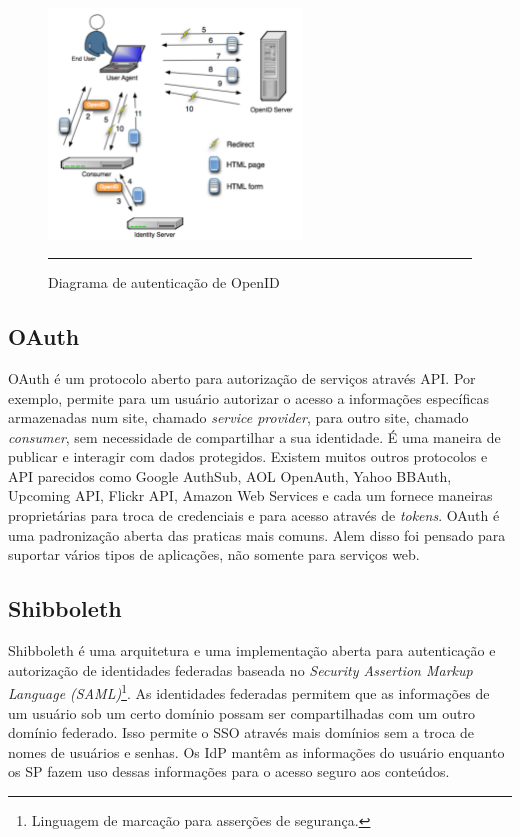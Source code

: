 \begin{figure}[htbp]
  \centering
  \includegraphics[width=0.6\textwidth]{./Figure/OpenID_Scenario.pdf}
  \rule{35em}{0.5pt}
  \caption[Diagrama de autenticação de OpenID]{Diagrama de autenticação de OpenID}
  \label{fig:OpenID}
\end{figure}

\subsection{OAuth}
OAuth é um protocolo aberto para autorização de serviços através
API. Por exemplo, permite para um usuário autorizar o acesso a
informações específicas armazenadas num site, chamado \emph{service
  provider}, para outro site, chamado \emph{consumer}, sem necessidade
de compartilhar a sua identidade. É uma maneira de publicar e
interagir com dados protegidos. Existem muitos outros protocolos e API
parecidos como Google AuthSub, AOL OpenAuth, Yahoo
BBAuth, Upcoming API, Flickr API, Amazon Web Services e cada um
fornece maneiras proprietárias para troca de credenciais e para acesso
através de \emph{tokens}. OAuth é uma padronização aberta das praticas
mais comuns. Alem disso foi pensado para suportar vários tipos de
aplicações, não somente para serviços web.

\subsection{Shibboleth}
Shibboleth é uma arquitetura e uma implementação aberta para
autenticação e autorização de identidades federadas baseada no
\emph{Security Assertion Markup Language (SAML)}\footnote{Linguagem de
marcação para asserções de segurança.}. As identidades federadas
permitem que as informações de um usuário sob um certo domínio possam
ser compartilhadas com um outro domínio federado. Isso permite o SSO
através mais domínios sem a troca de nomes de usuários e senhas. Os
IdP mantêm as informações do usuário enquanto os SP fazem uso dessas
informações para o acesso seguro aos conteúdos. 

